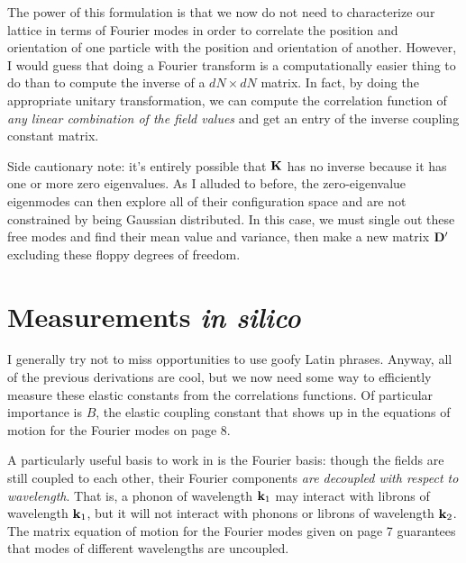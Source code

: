 \documentclass[12pt]{article}
\begin{document}
The power of this formulation is that we now do not need to characterize our lattice in terms of Fourier modes in order to correlate the position and orientation of one particle with the position and orientation of another. However, I would guess that doing a Fourier transform is a computationally easier thing to do than to compute the inverse of a $dN \times dN$ matrix. In fact, by doing the appropriate unitary transformation, we can compute the correlation function of \emph{any linear combination of the field values} and get an entry of the inverse coupling constant matrix.

Side cautionary note: it's entirely possible that $\mathbf{K}$ has no inverse because it has one or more zero eigenvalues. As I alluded to before, the zero-eigenvalue eigenmodes can then explore all of their configuration space and are not constrained by being Gaussian distributed. In this case, we must single out these free modes and find their mean value and variance, then make a new matrix $\mathbf{D}'$ excluding these floppy degrees of freedom.

\section{Measurements \emph{in silico}}

I generally try not to miss opportunities to use goofy Latin phrases. Anyway, all of the previous derivations are cool, but we now need some way to efficiently measure these elastic constants from the correlations functions. Of particular importance is $B$, the elastic coupling constant that shows up in the equations of motion for the Fourier modes on page 8.

A particularly useful basis to work in is the Fourier basis: though the fields are still coupled to each other, their Fourier components \emph{are decoupled with respect to wavelength}. That is, a phonon of wavelength $\mathbf{k}_1$ may interact with librons of wavelength $\mathbf{k}_1$, but it will not interact with phonons or librons of wavelength $\mathbf{k}_2$. The matrix equation of motion for the Fourier modes given on page 7 guarantees that modes of different wavelengths are uncoupled.
\end{document}

